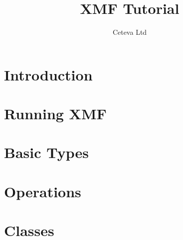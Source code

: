 \documentclass[a4paper]{article}
\title{XMF Tutorial}
\author{Ceteva Ltd}
\begin{document}
\maketitle
\tableofcontents

\section{Introduction}

\section{Running XMF}

\section{Basic Types}

\section{Operations}

\section{Classes}
\end{document}
